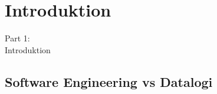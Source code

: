 \section{Introduktion}
\begin{frame}
    \vspace{25mm}
    \begin{center}
        \Huge{Part 1:\\Introduktion}
    \end{center}
\end{frame}

\subsection{Software Engineering vs Datalogi}
